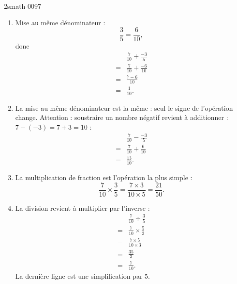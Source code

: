 
\begin{corrige}{2smath-0097}

    \begin{enumerate}
        \item
            Mise au même dénominateur :
            \begin{equation}
                \frac{ 3 }{ 5 }=\frac{ 6 }{ 10 },
            \end{equation}
            donc
            \begin{subequations}
                \begin{align}
                    &\frac{ 7 }{ 10 }+\frac{ -3 }{ 5 }\\
                    =&\frac{ 7 }{ 10 }+\frac{ -6 }{ 10 }\\
                    =&\frac{ 7-6 }{ 10 }\\
                    =&\frac{1}{ 10 }.
                \end{align}
            \end{subequations}
        \item
            La mise au même dénominateur est la même : seul le signe de l'opération change. Attention : soustraire un nombre négatif revient à additionner : \( 7-(-3)=7+3=10\) :
            \begin{subequations}
                \begin{align}
                    &\frac{ 7 }{ 10 }-\frac{ -3 }{ 5 }\\
                    =&\frac{ 7 }{ 10 }+\frac{ 6 }{ 10 }\\
                    =&\frac{ 13 }{ 10 }.
                \end{align}
            \end{subequations}
        \item
            La multiplication de fraction est l'opération la plus simple :
            \begin{equation}
                \frac{ 7 }{ 10 }\times \frac{ 3 }{ 5 }=\frac{ 7\times 3 }{ 10\times 5 }=\frac{ 21 }{ 50 }.
            \end{equation}
        \item
            La division revient à multiplier par l'inverse :
            \begin{subequations}
                \begin{align}
                    &\frac{ 7 }{ 10 }\div \frac{ 3 }{ 5 }\\
                    =&\frac{ 7 }{ 10 }\times \frac{ 5 }{ 3 }\\
                    =&\frac{ 7\times 5 }{ 10\times 3 }\\
                    =&\frac{ 35 }{ 3 }\\
                    =&\frac{ 7 }{ 10 }.
                \end{align}
            \end{subequations}
            La dernière ligne est une simplification par \( 5\).
    \end{enumerate}

\end{corrige}

